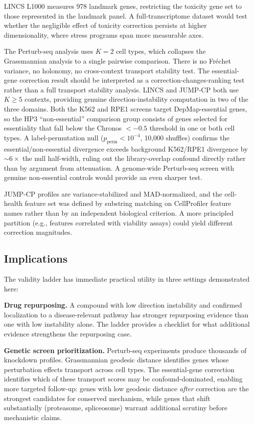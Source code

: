 \documentclass{article}
\begin{document}
LINCS L1000 measures 978 landmark genes, restricting the toxicity gene set to
those represented in the landmark panel. A full-transcriptome dataset would
test whether the negligible effect of toxicity correction persists at higher
dimensionality, where stress programs span more measurable axes.

The Perturb-seq analysis uses $K = 2$ cell types, which collapses the
Grassmannian analysis to a single pairwise comparison. There is no Fr\'echet
variance, no holonomy, no cross-context transport stability test. The
essential-gene correction result should be interpreted as a
correction-changes-ranking test rather than a full transport stability
analysis. LINCS and JUMP-CP both use $K \geq 5$ contexts, providing
genuine direction-instability computation in two of the three domains.
Both the K562 and RPE1 screens target DepMap-essential genes, so the
HP3 ``non-essential'' comparison group consists of genes selected for
essentiality that fall below the Chronos $< -0.5$ threshold in one or
both cell types. A label-permutation null ($p_{\text{perm}} < 10^{-4}$,
10{,}000 shuffles) confirms the essential/non-essential divergence exceeds
background K562/RPE1 divergence by ${\sim}6\times$ the null half-width,
ruling out the library-overlap confound directly rather than by argument
from attenuation. A genome-wide Perturb-seq screen with genuine
non-essential controls would provide an even sharper test.

JUMP-CP profiles are variance-stabilized and MAD-normalized, and the
cell-health feature set was defined by substring matching on CellProfiler
feature names rather than by an independent biological criterion. A more
principled partition (e.g., features correlated with viability assays)
could yield different correction magnitudes.

\subsection{Implications}

The validity ladder has immediate practical utility in three settings
demonstrated here:

\textbf{Drug repurposing.} A compound with low direction instability and
confirmed localization to a disease-relevant pathway has stronger repurposing
evidence than one with low instability alone. The ladder provides a checklist
for what additional evidence strengthens the repurposing case.

\textbf{Genetic screen prioritization.} Perturb-seq experiments produce
thousands of knockdown profiles. Grassmannian geodesic distance identifies
genes whose perturbation effects transport across cell types. The
essential-gene correction identifies which of these transport scores may be
confound-dominated, enabling more targeted follow-up: genes with low
geodesic distance \emph{after} correction are the strongest candidates for
conserved mechanism, while genes that shift substantially (proteasome,
spliceosome) warrant additional scrutiny before mechanistic claims.
\end{document}
